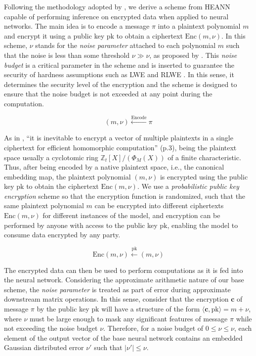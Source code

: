 \documentclass{article}
\begin{document}
Following the methodology adopted by \cite{gentry2011implementing}, we derive a scheme from HEANN capable of performing inference on encrypted data when applied to neural networks. The main idea is to encode a message \(\pi\) into a plaintext polynomial \(m\) and encrypt it using a public key \(\text{pk}\) to obtain a ciphertext \(\text{Enc}(m, \nu)\). In this scheme, \(\nu\) stands for the \emph{noise parameter} attached to each polynomial \(m\) such that the noise is less than some threshold \(\nu \gg \nu\), as proposed by \cite{gentry2009fully}. This \emph{noise budget} is a critical parameter in the scheme and is inserted to guarantee the security of hardness assumptions such as LWE \cite{regev2009lattices} and RLWE \cite{lyubashevsky2010ideal}. In this sense, it determines the security level of the encryption and the scheme is designed to ensure that the noise budget is not exceeded at any point during the computation.

\[
(m, \nu) \xleftarrow{\text{Encode}} \pi
\]

As in \cite{cheon2017homomorphic}, “it is inevitable to encrypt a vector of multiple plaintexts in a single ciphertext for efficient homomorphic computation” (p.3), being the plaintext space usually a cyclotomic ring \(\mathbb{Z}_t[X]/(\Phi_M(X))\) of a finite characteristic. Thus, after being encoded by a native plaintext space, i.e., the canonical embedding map, the plaintext polynomial \((m, \nu)\) is encrypted using the public key \(\text{pk}\) to obtain the ciphertext \(\text{Enc}(m, \nu)\). We use a \emph{probabilistic public key encryption} scheme so that the encryption function is randomized, such that the same plaintext polynomial \(m\) can be encrypted into different ciphertexts \(\text{Enc}(m, \nu)\) for different instances of the model, and encryption can be performed by anyone with access to the public key \(\text{pk}\), enabling the model to consume data encrypted by any party.

\[
\text{Enc}(m, \nu) \xleftarrow{\text{pk}} (m, \nu)
\]

The encrypted data can then be used to perform computations as it is fed into the neural network. Considering the approximate arithmetic nature of our base scheme, the \emph{noise parameter} is treated as part of error during approximate downstream matrix operations. In this sense, consider that the encryption \(\mathbf{c}\) of message \(\pi\) by the public key \(\text{pk}\) will have a structure of the form \(\langle \mathbf{c}, \text{pk} \rangle = m + \nu\), where \(\nu\) must be large enough to mask any significant features of message \(\pi\) while not exceeding the noise budget \(\nu\). Therefore, for a noise budget of \(0 \leq \nu \leq \nu\), each element of the output vector of the base neural network contains an embedded Gaussian distributed error \(\nu'\) such that \(\lvert \nu' \rvert \leq \nu\).
\end{document}
